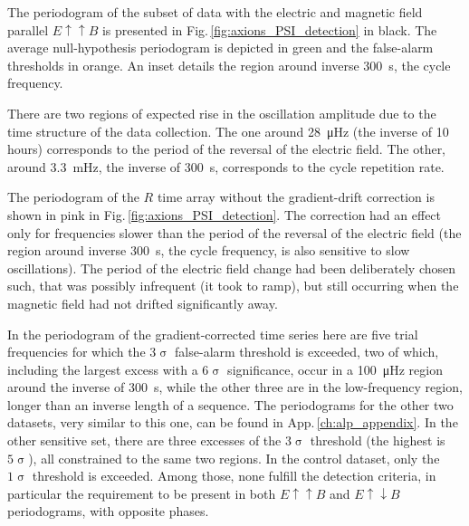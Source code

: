 The periodogram of the subset of data with the electric and magnetic field parallel $E \uparrow \uparrow B$ is presented in Fig.\,\ref{fig:axions_PSI_detection} in black. The average null-hypothesis periodogram is depicted in green and the false-alarm thresholds in orange. An inset details the region around inverse \SI{300}{\second}, the cycle frequency.

There are two regions of expected rise in the oscillation amplitude due to the time structure of the data collection.
The one around \SI{28}{\micro\hertz} (the inverse of 10 hours) corresponds to the period of the reversal of the electric field.
The other, around \SI{3.3}{\milli\hertz}, the inverse of \SI{300}{\second}, corresponds to the cycle repetition rate.

The periodogram of the $R$ time array without the gradient-drift correction is shown in pink in Fig.\,\ref{fig:axions_PSI_detection}. The correction had an effect only for frequencies slower than the period of the reversal of the electric field (the region around inverse \SI{300}{\second}, the cycle frequency, is also sensitive to slow oscillations). The period of the electric field change had been deliberately chosen such, that was possibly infrequent (it took  to ramp), but still occurring when the magnetic field had not drifted significantly away.

In the periodogram of the gradient-corrected time series here are five
trial frequencies for which the $3\upsigma$ false-alarm threshold is exceeded,
two of which, including the largest excess with a $6\upsigma$ significance, occur in a \SI{100}{\micro\hertz} region around the inverse of \SI{300}{\second}, while the other three are in the low-frequency region, longer than an inverse length of a sequence.
 The periodograms for the other two datasets, very similar to this one, can be found in App.\,\ref{ch:alp_appendix}.
In the other sensitive set, there are three excesses of the $3\upsigma$ threshold (the highest is $5\upsigma$), all constrained to the same two regions. In the control dataset, only the $1\upsigma$ threshold is exceeded. Among those, none fulfill the detection criteria, in particular the requirement to be present in both $E \uparrow \uparrow B$ and $E \uparrow \downarrow B$ periodograms, with opposite phases.

